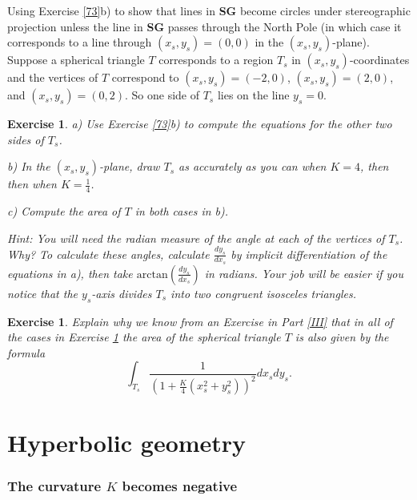 \documentclass{article}%
\newtheorem{exercise}[theorem]{Exercise}
\begin{document}
Using Exercise \ref{73}b) to show that lines in \textbf{SG} become circles
under stereographic projection unless the line in \textbf{SG} passes through
the North Pole (in which case it corresponds to a line through $\left(
x_{s},y_{s}\right)  =\left(  0,0\right)  $ in the $\left(  x_{s},y_{s}\right)
$-plane). Suppose a spherical triangle $T$ corresponds to a region $T_{s}$ in
$\left(  x_{s},y_{s}\right)  $-coordinates and the vertices of $T$ correspond
to $\left(  x_{s},y_{s}\right)  =\left(  -2,0\right)  $, $\left(  x_{s}%
,y_{s}\right)  =\left(  2,0\right)  $, and $\left(  x_{s},y_{s}\right)
=\left(  0,2\right)  $. So one side of $T_{s}$ lies on the line $y_{s}=0$.

\begin{exercise}
\label{st}a) Use Exercise \ref{73}b) to compute the equations for the other
two sides of $T_{s}$.

b) In the $\left(  x_{s},y_{s}\right)  $-plane, draw $T_{s}$ as accurately as
you can when $K=4$, then then when $K=\frac{1}{4}$.

c) Compute the area of $T$ in both cases in b).

Hint: You will need the radian measure of the angle at each of the vertices of
$T_{s}$. Why? To calculate these angles, calculate $\frac{dy_{s}}{dx_{s}}$ by
implicit differentiation of the equations in a), then take $\mathrm{arctan}%
\left(  \frac{dy_{s}}{dx_{s}}\right)  $ in radians. Your job will be easier if
you notice that the $y_{s}$-axis divides $T_{s}$ into two congruent isosceles triangles.
\end{exercise}

\begin{exercise}
Explain why we know from an Exercise in Part \ref{III} that in all of the
cases in Exercise \ref{st} the area of the spherical triangle $T$ is also
given by the formula%
\[%
{\displaystyle\int\nolimits_{T_{s}}}
\frac{1}{\left(  1+\frac{K}{4}\left(  x_{s}^{2}+y_{s}^{2}\right)  \right)
^{2}}dx_{s}dy_{s}.
\]

\end{exercise}

\pagebreak

\part{Hyperbolic geometry\label{VI}}

\section{The curvature $K$ becomes negative}
\end{document}
